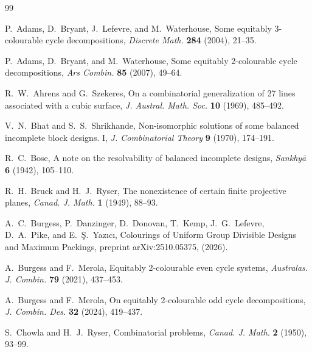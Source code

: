 \documentclass[12pt]{article}
\theoremstyle{definition}
\begin{document}
\begin{thebibliography}{99}

P.~Adams, D.~Bryant, J.~Lefevre, and M.~Waterhouse, Some equitably 3-colourable cycle decompositions, \emph{Discrete Math.} \textbf{284} (2004), 21--35.

P.~Adams, D.~Bryant, and M.~Waterhouse, Some equitably 2-colourable cycle decompositions, \emph{Ars Combin.} \textbf{85} (2007), 49--64.

R.~W.~Ahrens and G.~Szekeres, On a combinatorial generalization of 27 lines associated with a cubic surface, \emph{J. Austral. Math. Soc.} \textbf{10} (1969), 485--492.



V.~N.~Bhat and S.~S.~Shrikhande, Non-isomorphic solutions of some balanced incomplete block designs. I, \emph{J. Combinatorial Theory} \textbf{9} (1970), 174--191.


R.~C.~Bose, A note on the resolvability of balanced incomplete designs,
\emph{Sankhyā} \textbf{6} (1942), 105--110.

R.~H.~Bruck and H.~J.~Ryser, The nonexistence of certain finite projective planes, \emph{Canad. J. Math.} \textbf{1} (1949), 88--93.

A.~C.~Burgess, P.~Danzinger, D.~Donovan, T.~Kemp, J.~G.~Lefevre, D.~A.~Pike, and E.~Ş.~Yazıcı, Colourings of Uniform Group Divisible Designs and
Maximum Packings, preprint arXiv:2510.05375, (2026).

A.~Burgess and F.~Merola, Equitably 2-colourable even cycle systems, \emph{Australas. J. Combin.} \textbf{79} (2021), 437--453.

A.~Burgess and F.~Merola, On equitably 2-colourable odd cycle decompositions, \emph{J. Combin. Des.} \textbf{32} (2024), 419--437.

S.~Chowla and H.~J.~Ryser, Combinatorial problems, \emph{Canad. J. Math.} \textbf{2} (1950), 93--99.


\end{thebibliography}
\end{document}
